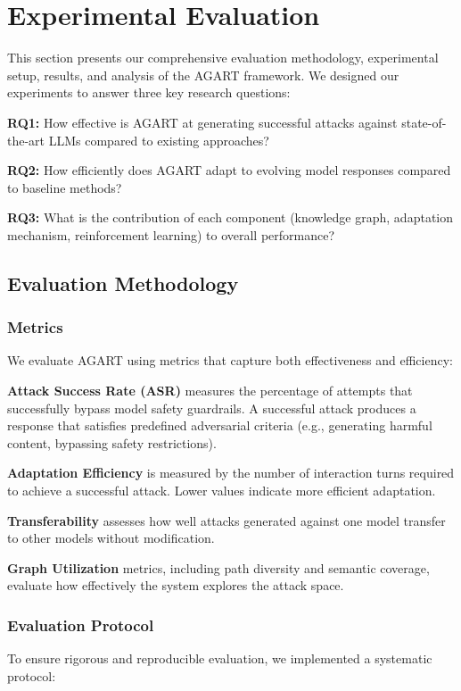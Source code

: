 \section{Experimental Evaluation}

This section presents our comprehensive evaluation methodology, experimental setup, results, and analysis of the AGART framework. We designed our experiments to answer three key research questions:

\textbf{RQ1:} How effective is AGART at generating successful attacks against state-of-the-art LLMs compared to existing approaches?

\textbf{RQ2:} How efficiently does AGART adapt to evolving model responses compared to baseline methods?

\textbf{RQ3:} What is the contribution of each component (knowledge graph, adaptation mechanism, reinforcement learning) to overall performance?

\subsection{Evaluation Methodology}

\subsubsection{Metrics}
We evaluate AGART using metrics that capture both effectiveness and efficiency:

\textbf{Attack Success Rate (ASR)} measures the percentage of attempts that successfully bypass model safety guardrails. A successful attack produces a response that satisfies predefined adversarial criteria (e.g., generating harmful content, bypassing safety restrictions).

\textbf{Adaptation Efficiency} is measured by the number of interaction turns required to achieve a successful attack. Lower values indicate more efficient adaptation.

\textbf{Transferability} assesses how well attacks generated against one model transfer to other models without modification.

\textbf{Graph Utilization} metrics, including path diversity and semantic coverage, evaluate how effectively the system explores the attack space.

\subsubsection{Evaluation Protocol}
To ensure rigorous and reproducible evaluation, we implemented a systematic protocol:

